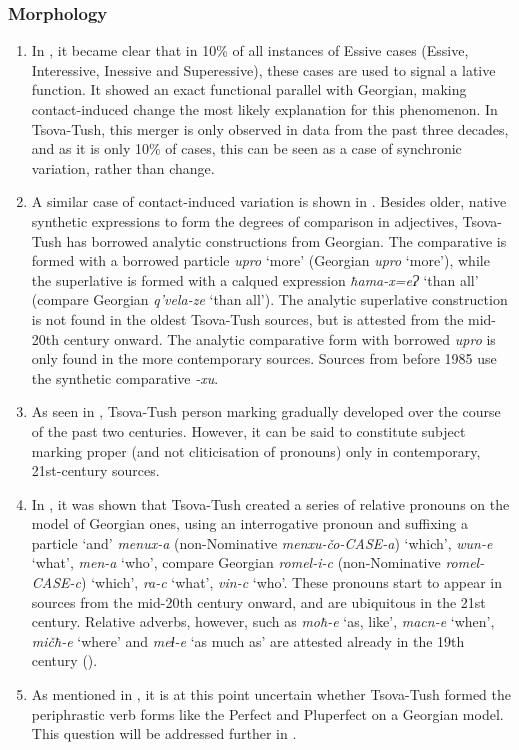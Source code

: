\subsubsection{Morphology} \label{conclmorph}
\begin{enumerate}
	\item In , it became clear that in 10\% of all instances of Essive cases (Essive, Interessive, Inessive and Superessive), these cases are used to signal a lative function. It showed an exact functional parallel with Georgian, making contact-induced change the most likely explanation for this phenomenon. In Tsova-Tush, this merger is only observed in data from the past three decades, and as it is only 10\% of cases, this can be seen as a case of synchronic variation, rather than change.
	
	\item A similar case of contact-induced variation is shown in . Besides older, native synthetic expressions to form the degrees of comparison in adjectives, Tsova-Tush has borrowed analytic constructions from Georgian. The comparative is formed with a borrowed particle \textit{upro} `more' (Georgian \textit{upro} `more'), while the superlative is formed with a calqued expression \textit{ħama-x=eɁ} `than all' (compare Georgian \textit{q'vela-ze} `than all'). The analytic superlative construction is not found in the oldest Tsova-Tush sources, but is attested from the mid-20th century onward. The analytic comparative form with borrowed \textit{upro} is only found in the more contemporary sources. Sources from before 1985 use the synthetic comparative \textit{-xu}.
	
	\item As seen in , Tsova-Tush person marking gradually developed over the course of the past two centuries. However, it can be said to constitute subject marking proper (and not cliticisation of pronouns) only in contemporary, 21st-century sources.
	
	\item In , it was shown that Tsova-Tush created a series of relative pronouns on the model of Georgian ones, using an interrogative pronoun and suffixing a particle `and' \textit{menux-a} (non-Nominative \textit{menxu-čo-CASE-a}) `which', \textit{wun-e} `what', \textit{men-a} `who', compare Georgian \textit{romel-i-c} (non-Nominative \textit{romel-CASE-c}) `which', \textit{ra-c} `what', \textit{vin-c} `who'. These pronouns start to appear in sources from the mid-20th century onward, and are ubiquitous in the 21st century. Relative adverbs, however, such as \textit{moħ-e} `as, like', \textit{macn-e} `when', \textit{mičħ-e} `where' and \textit{meɬ-e} `as much as' are attested already in the 19th century ().
	
	\item As mentioned in , it is at this point uncertain whether Tsova-Tush formed the periphrastic verb forms like the Perfect and Pluperfect on a Georgian model. This question will be addressed further in \textcite{wsverhees2024nakhevid}.
	
\end{enumerate}

